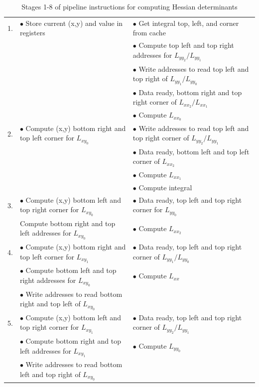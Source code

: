 \documentclass{article}
\begin{document}
\begin{table}[h]
	\centering
	\caption{Stages 1-8 of pipeline instructions for computing Hessian determinants}
	\label{table_pipeline_1}
	\begin{tabulary}{1.0\textwidth}{L|L|L}
		1. & $\bullet$ Store current (x,y) and value in registers & $\bullet$ Get integral top, left, and corner from cache \\
		& & $\bullet$ Compute top left and top right addresses for $L_{yy_2}/L_{yy_1}$ \\
		& & $\bullet$ Write addresses to read top left and top right of $L_{yy_1}/L_{yy_0}$ \\
		& & $\bullet$ Data ready, bottom right and top right corner of $L_{xx_2}/L_{xx_1}$ \\
		& & $\bullet$ Compute $L_{xx_0}$ \\
		\hline
		
		2. & $\bullet$ Compute (x,y) bottom right and top left corner for $L_{xy_0}$ & $\bullet$ Write addresses to read top left and top right corner of $L_{yy_2}/L_{yy_1}$ \\
		& & $\bullet$ Data ready, bottom left and top left corner of $L_{xx_2}$ \\
		& & $\bullet$ Compute $L_{xx_1}$ \\
		& & $\bullet$ Compute integral \\
		\hline
		
		3. & $\bullet$ Compute (x,y) bottom left and top right corner for $L_{xy_0}$ & $\bullet$ Data ready, top left and top right corner for $L_{yy_0}$ \\
		& Compute bottom right and top left addresses for $L_{xy_0}$ & $\bullet$ Compute $L_{xx_2}$ \\
		\hline
		
		4. & $\bullet$ Compute (x,y) bottom right and top left corner for $L_{xy_1}$ & $\bullet$ Data ready, top left and top right corner of $L_{yy_1}/L_{yy_0}$ \\
		& $\bullet$ Compute bottom left and top right addresses for $L_{xy_0}$ & $\bullet$ Compute $L_{xx}$ \\
		& $\bullet$ Write addresses to read bottom right and top left of $L_{xy_0}$ & \\
		\hline
		
		5. & $\bullet$ Compute (x,y) bottom left and top right corner for $L_{xy_1}$ & $\bullet$ Data ready, top left and top right corner of $L_{yy_2}/L_{yy_1}$ \\
		& $\bullet$ Compute bottom right and top left addresses for $L_{xy_1}$ & $\bullet$ Compute $L_{yy_0}$ \\
		& $\bullet$ Write addresses to read bottom left and top right of $L_{xy_0}$ & \\
		\hline
		

\end{tabulary}
\end{table}
\end{document}
